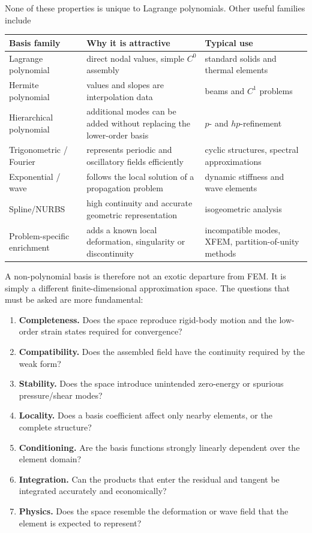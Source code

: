 None of these properties is unique to Lagrange polynomials.  Other useful
families include

\begin{center}
\begin{tabular}{>{\raggedright\arraybackslash}p{}>{\raggedright\arraybackslash}p{}>{\raggedright\arraybackslash}p{}}
\hline
\textbf{Basis family} & \textbf{Why it is attractive} & \textbf{Typical use}\\
\hline
Lagrange polynomial & direct nodal values, simple $C^0$ assembly & standard solids and thermal elements\\
Hermite polynomial & values and slopes are interpolation data & beams and $C^1$ problems\\
Hierarchical polynomial & additional modes can be added without replacing the lower-order basis & $p$- and $hp$-refinement\\
Trigonometric / Fourier & represents periodic and oscillatory fields efficiently & cyclic structures, spectral approximations\\
Exponential / wave & follows the local solution of a propagation problem & dynamic stiffness and wave elements\\
Spline/NURBS & high continuity and accurate geometric representation & isogeometric analysis\\
Problem-specific enrichment & adds a known local deformation, singularity or discontinuity & incompatible modes, XFEM, partition-of-unity methods\\
\hline
\end{tabular}
\end{center}

A non-polynomial basis is therefore not an exotic departure from FEM.  It is
simply a different finite-dimensional approximation space.  The questions that
must be asked are more fundamental:

\begin{enumerate}
    \item \textbf{Completeness.} Does the space reproduce rigid-body motion and
          the low-order strain states required for convergence?
    \item \textbf{Compatibility.} Does the assembled field have the continuity
          required by the weak form?
    \item \textbf{Stability.} Does the space introduce unintended zero-energy
          or spurious pressure/shear modes?
    \item \textbf{Locality.} Does a basis coefficient affect only nearby
          elements, or the complete structure?
    \item \textbf{Conditioning.} Are the basis functions strongly linearly
          dependent over the element domain?
    \item \textbf{Integration.} Can the products that enter the residual and
          tangent be integrated accurately and economically?
    \item \textbf{Physics.} Does the space resemble the deformation or wave
          field that the element is expected to represent?
\end{enumerate}

